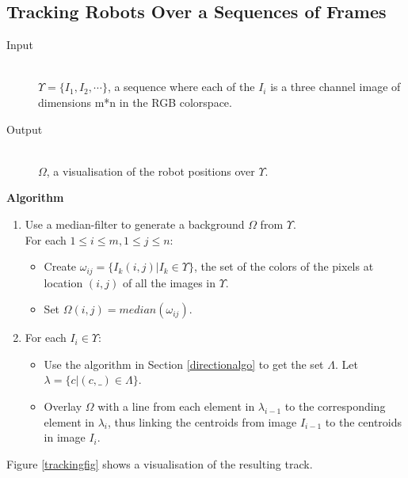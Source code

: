 \documentclass[10pt,a4paper]{article}
\begin{document}
\subsection{Tracking Robots Over a Sequences of Frames}\label{trackingalgo}
\begin{description}
\item[Input] \hfill \\
    $\Upsilon = \{I_1, I_2, \cdots\}$, a sequence where each of the $I_i$ is a 
    three channel image of dimensions m*n in the RGB colorspace.
\item[Output] \hfill \\
    $\Omega$, a visualisation of the robot positions over $\Upsilon$.
\end{description}
\textbf{Algorithm}
\begin{enumerate}
    \item
    Use a median-filter to generate a background $\Omega$ from $\Upsilon$. \\
    For each $1 \le i \le m, 1 \le j \le n$:
    \begin{itemize}
        \item
        Create $\omega_{ij} = \{I_k(i,j) | I_k \in \Upsilon\}$, the set of the 
        colors of the pixels at location $(i,j)$ of all the images in 
        $\Upsilon$.
        \item
        Set $\Omega(i,j) = median(\omega_{ij})$.
    \end{itemize}
    \item
    For each $I_i \in \Upsilon$:
    \begin{itemize}
        \item
        Use the algorithm in Section \ref{directionalgo} to get the set 
        $\Lambda$. Let $\lambda = \{c | (c, \_) \in \Lambda\}$.
        \item
        Overlay $\Omega$ with a line from each element in $\lambda_{i-1}$ to 
        the corresponding element in $\lambda_i$, thus linking the centroids 
        from image $I_{i-1}$ to the centroids in image $I_i$.
    \end{itemize}
\end{enumerate} 
Figure \ref{trackingfig} shows a visualisation of the resulting track.
\end{document}

